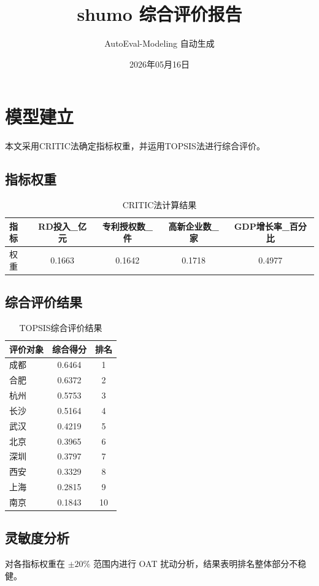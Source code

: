 \documentclass[12pt]{ctexart}
\begin{document}
\title{shumo 综合评价报告}
\author{AutoEval-Modeling 自动生成}
\date{2026年05月16日}
\maketitle

\section{模型建立}

本文采用CRITIC法确定指标权重，并运用TOPSIS法进行综合评价。

\subsection{指标权重}
\begin{table}[htbp]\centering
\caption{CRITIC法计算结果}
\begin{tabular}{lcccc}
\toprule
指标 & RD投入_亿元 & 专利授权数_件 & 高新企业数_家 & GDP增长率_百分比 \\
\midrule
权重 & 0.1663 & 0.1642 & 0.1718 & 0.4977 \\
\bottomrule
\end{tabular}\end{table}

\subsection{综合评价结果}
\begin{table}[htbp]\centering
\caption{TOPSIS综合评价结果}
\begin{tabular}{lcc}
\toprule
评价对象 & 综合得分 & 排名 \\
\midrule
成都 & 0.6464 & 1 \\
合肥 & 0.6372 & 2 \\
杭州 & 0.5753 & 3 \\
长沙 & 0.5164 & 4 \\
武汉 & 0.4219 & 5 \\
北京 & 0.3965 & 6 \\
深圳 & 0.3797 & 7 \\
西安 & 0.3329 & 8 \\
上海 & 0.2815 & 9 \\
南京 & 0.1843 & 10 \\
\bottomrule
\end{tabular}\end{table}

\subsection{灵敏度分析}
对各指标权重在 $\pm 20\%$ 范围内进行 OAT 扰动分析，结果表明排名整体部分不稳健。
\end{document}
